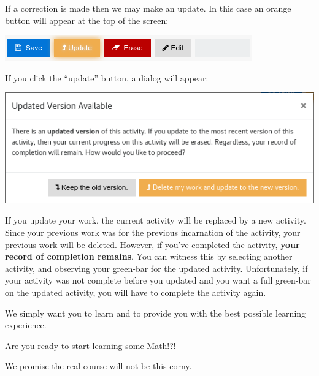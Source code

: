 \documentclass{ximera}
\begin{document}
If a correction is made then we may make an update. In this case an orange button will appear at the top of the screen:
\begin{image}
  \includegraphics{update.png}
\end{image}
If you click the ``update'' button, a dialog will appear:
\begin{image}
  \includegraphics{updateDialog.png}
\end{image}
If you update your work, the current activity will be replaced by a
new activity. Since your previous work was for the previous
incarnation of the activity, your previous work will be
deleted. However, if you've completed the activity, \textbf{your
  record of completion remains}. You can witness this by selecting
another activity, and observing your green-bar for the updated
activity.  Unfortunately, if your activity was not complete before you
updated and you want a full green-bar on the updated activity, you
will have to complete the activity again.


We simply want you to learn and to provide you with the best possible
learning experience.

\begin{problem}
  Are you ready to start learning some Math!?!
  \begin{multipleChoice}
  \end{multipleChoice}
  \begin{hint}
    We promise the real course will not be this corny.
  \end{hint}
\end{problem}
\end{document}
